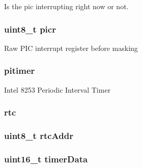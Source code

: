 \label{classTsunamiIO_ab72d9ca48cf8b7b897799490833c4b5e}
Is the pic interrupting right now or not. \hypertarget{classTsunamiIO_a8472e2cd6c519d77f7b7ab878a42fa40}{
\subsubsection[{picr}]{\setlength{\rightskip}{0pt plus 5cm}uint8\_\-t {\bf picr}}}
\label{classTsunamiIO_a8472e2cd6c519d77f7b7ab878a42fa40}
Raw PIC interrupt register before masking \hypertarget{classTsunamiIO_a0447f4b0ded66f26d3ce882c29d1125e}{
\subsubsection[{pitimer}]{ {\bf pitimer}}}
\label{classTsunamiIO_a0447f4b0ded66f26d3ce882c29d1125e}
Intel 8253 Periodic Interval Timer \hypertarget{classTsunamiIO_afa7e240c7456eaf5ef27ee8be3a23bd4}{
\subsubsection[{rtc}]{ {\bf rtc}}}
\label{classTsunamiIO_afa7e240c7456eaf5ef27ee8be3a23bd4}
\hypertarget{classTsunamiIO_a4603c0adbe60021db8e6d488b0366d75}{
\subsubsection[{rtcAddr}]{\setlength{\rightskip}{0pt plus 5cm}uint8\_\-t {\bf rtcAddr}}}
\label{classTsunamiIO_a4603c0adbe60021db8e6d488b0366d75}
\hypertarget{classTsunamiIO_ac2f6e48e9ea7cdd01d0d4855725107d6}{
\subsubsection[{timerData}]{\setlength{\rightskip}{0pt plus 5cm}uint16\_\-t {\bf timerData}}}
